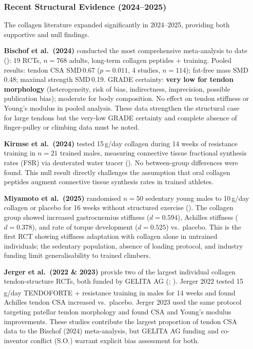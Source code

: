 \subsubsection{Recent Structural Evidence (2024--2025)}
\label{subsubsec:collrecent}

The collagen literature expanded significantly in 2024--2025, providing both supportive and null findings.

\textbf{Bischof et al.\ (2024)} conducted the most comprehensive meta-analysis to date (\cite{BMSK24}): 19 RCTs, $n{=}768$ adults, long-term collagen peptides $+$ training. Pooled results: tendon CSA SMD\,0.67 ($p{=}0.011$, 4 studies, $n{=}114$); fat-free mass SMD\,0.48; maximal strength SMD\,0.19. GRADE certainty: \textbf{very low for tendon morphology} (heterogeneity, risk of bias, indirectness, imprecision, possible publication bias); moderate for body composition. No effect on tendon stiffness or Young's modulus in pooled analysis. These data strengthen the structural case for large tendons but the very-low GRADE certainty and complete absence of finger-pulley or climbing data must be noted.

\textbf{Kirmse et al.\ (2024)} tested 15\,g/day collagen during 14 weeks of resistance training in $n{=}21$ trained males, measuring connective tissue fractional synthesis rates (FSR) via deuterated water tracer (\cite{KLV+24}). No between-group differences were found. This null result directly challenges the assumption that oral collagen peptides augment connective tissue synthesis rates in trained athletes.

\textbf{Miyamoto et al.\ (2025)} randomised $n{=}50$ sedentary young males to 10\,g/day collagen or placebo for 16 weeks without structured exercise (\cite{MIO+25}). The collagen group showed increased gastrocnemius stiffness ($d{=}0.594$), Achilles stiffness ($d{=}0.378$), and rate of torque development ($d{=}0.525$) vs.\ placebo. This is the first RCT showing stiffness adaptation with collagen alone in untrained individuals; the sedentary population, absence of loading protocol, and industry funding limit generalisability to trained climbers.

\textbf{Jerger et al.\ (2022 \& 2023)} provide two of the largest individual collagen tendon-structure RCTs, both funded by GELITA AG (\cite{JCL+22}; \cite{JCL+23}). Jerger 2022 tested 15\,g/day TENDOFORTE\textsuperscript{\textregistered} $+$ resistance training in males for 14 weeks and found Achilles tendon CSA increased vs.\ placebo. Jerger 2023 used the same protocol targeting patellar tendon morphology and found CSA and Young's modulus improvements. These studies contribute the largest proportion of tendon CSA data to the Bischof (2024) meta-analysis, but GELITA AG funding and co-inventor conflict (S.O.) warrant explicit bias assessment for both.

